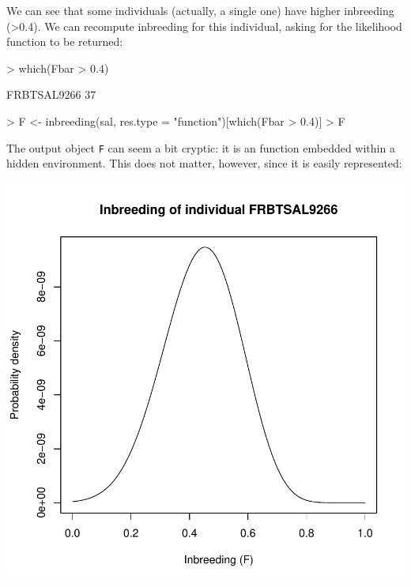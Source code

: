 \documentclass{article}
\begin{document}
\noindent We can see that some individuals (actually, a single one) have higher inbreeding (>0.4). We can recompute
inbreeding for this individual, asking for the likelihood function to be returned:
\begin{Schunk}
\begin{Sinput}
> which(Fbar > 0.4)
\end{Sinput}
\begin{Soutput}
FRBTSAL9266 
         37 
\end{Soutput}
\begin{Sinput}
> F <- inbreeding(sal, res.type = "function")[which(Fbar > 0.4)]
> F
\end{Sinput}
\end{Schunk}
The output object \texttt{F} can seem a bit cryptic: it is an function embedded within a hidden environment.
This does not matter, however, since it is easily represented:
\begin{Schunk}
\end{Schunk}
\includegraphics{figs/base-070}
\end{document}
